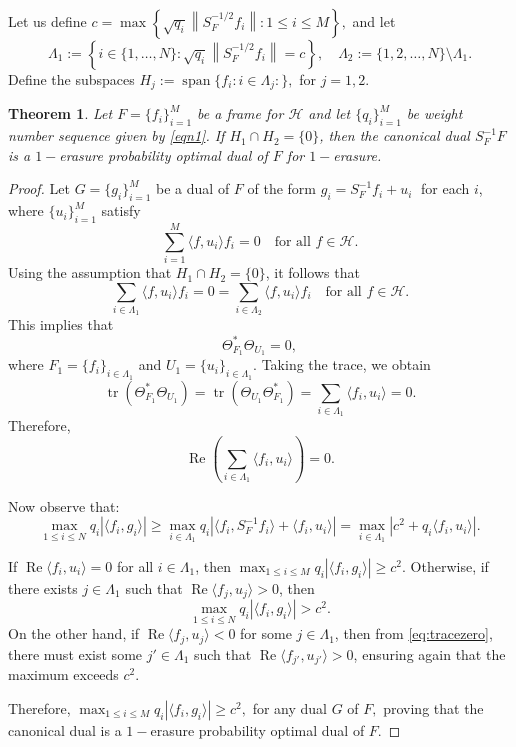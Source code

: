 \documentclass[final,1p,times]{elsarticle}
\newtheorem{thm}{Theorem}[section]
\begin{document}
Let us define $c = \max \left\{ \sqrt{q_i} \left\| S_F^{-1/2} f_i \right\|:1 \leq i \leq M \right\},$ and let
\[
\Lambda_1 := \left\{ i \in \{1,\dots,N\} : \sqrt{q_i} \left\| S_F^{-1/2} f_i \right\| = c \right\}, \quad
\Lambda_2 := \{1, 2, \dots, N\} \setminus \Lambda_1.
\]
Define the subspaces $H_j := \operatorname{span} \{ f_i : i \in \Lambda_j :  \},$ for $j=1,2.$ 

\begin{thm}\label{thm3point1}
Let $F = \{f_i\}_{i=1}^M$ be a frame for $\mathcal{H}$ and let $\{q_i\}_{i=1}^M$ be  weight number sequence given by \eqref{eqn1}. If $H_1 \cap H_2 = \{0\}$, then the canonical dual $S_{F}^{-1}F$ is a $1-$erasure probability optimal dual of $F$ for $1-$erasure.
\end{thm}

\begin{proof}
Let $G = \{g_i\}_{i=1}^M$ be a dual of $F$ of the form $g_i = S_F^{-1}f_i + u_i \;$ for each $i$, where  $\{u_i\}_{i=1}^M$ satisfy
\[
\sum_{i=1}^M \langle f, u_i \rangle f_i = 0 \quad \text{for all } f \in \mathcal{H}.
\]
Using the assumption that $H_1 \cap H_2 = \{0\}$, it follows that
\[
\sum_{i \in \Lambda_1} \langle f, u_i \rangle f_i = 0 = \sum_{i \in \Lambda_2} \langle f, u_i \rangle f_i\quad \text{for all } f \in \mathcal{H}.
\]
This implies that
\[
\Theta_{F_1}^* \Theta_{U_1} = 0,
\]
where $F_1 = \{f_i\}_{i \in \Lambda_1}$ and $U_1 = \{u_i\}_{i \in \Lambda_1}$. Taking the trace, we obtain
\[
\operatorname{tr}\left(\Theta_{F_1}^* \Theta_{U_1}\right) = \operatorname{tr}\left(\Theta_{U_1} \Theta_{F_1}^*\right) = \sum_{i \in \Lambda_1} \langle f_i, u_i \rangle = 0.
\]
Therefore,
\begin{equation} \label{eq:tracezero}
\operatorname{Re} \left( \sum_{i \in \Lambda_1} \langle f_i, u_i \rangle \right) = 0.
\end{equation}

Now observe that:
\[
\max_{1 \leq i \leq N} q_i |\langle f_i, g_i \rangle|
\geq \max_{i \in \Lambda_1} q_i |\langle f_i, S_F^{-1} f_i \rangle + \langle f_i, u_i \rangle|
= \max_{i \in \Lambda_1} \left| c^2 + q_i \langle f_i, u_i \rangle \right|.
\]

If $\operatorname{Re} \langle f_i, u_i \rangle = 0$ for all $i \in \Lambda_1$, then $\max_{1 \leq i \leq M} q_i |\langle f_i, g_i \rangle| \geq c^2.$ Otherwise, if there exists $j \in \Lambda_1$ such that $\operatorname{Re} \langle f_j, u_j \rangle > 0$, then
\[
\max_{1 \leq i \leq N} q_i |\langle f_i, g_i \rangle| > c^2.
\]
On the other hand, if $\operatorname{Re} \langle f_j, u_j \rangle < 0$ for some $j \in \Lambda_1$, then from \eqref{eq:tracezero}, there must exist some $j' \in \Lambda_1$ such that $\operatorname{Re} \langle f_{j'}, u_{j'} \rangle > 0$, ensuring again that the maximum exceeds $c^2$.

Therefore, $\max_{1 \leq i \leq M} q_i |\langle f_i, g_i \rangle| \geq c^2,$ for any dual $G$ of $F,$ proving that the canonical dual is a $1-$erasure probability optimal dual of $F$.

\end{proof}
\end{document}

